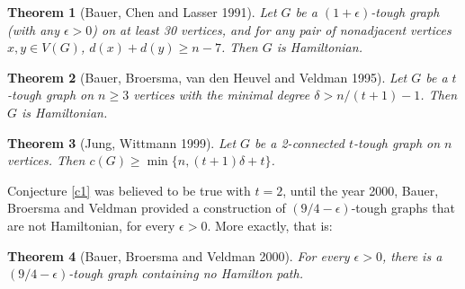 \documentclass[12pt]{report}
\newtheorem{theorem}{Theorem}
\begin{document}
\begin{theorem}[Bauer, Chen and Lasser 1991]
Let $G$ be a $(1+\epsilon)$-tough graph (with any $\epsilon>0$) on at least 30 vertices, and for any pair of nonadjacent vertices $x,y\in V(G)$, $d(x)+d(y)\ge n-7$. Then $G$ is Hamiltonian.
\end{theorem}

\begin{theorem}[Bauer, Broersma, van den Heuvel and Veldman 1995]
Let $G$ be a $t$-tough graph on $n\ge3$ vertices with the minimal degree $\delta>n/(t+1)-1$. Then $G$ is Hamiltonian.
\end{theorem}

\begin{theorem}[Jung, Wittmann 1999]
Let $G$ be a 2-connected $t$-tough graph on $n$ vertices. Then $c(G)\ge\min\{n,(t+1)\delta+t\}$.
\end{theorem}

Conjecture \ref{c1} was believed to be true with $t=2$, until the year 2000, Bauer, Broersma and Veldman \cite{bauer2000not} provided a construction of $(9/4-\epsilon)$-tough graphs that are not Hamiltonian, for every $\epsilon>0$. More exactly, that is:
\begin{theorem}[Bauer, Broersma and Veldman 2000]\label{exa2000nh}
For every $\epsilon>0$, there is a $(9/4-\epsilon)$-tough  graph containing no Hamilton path.
\end{theorem}
\end{document}
